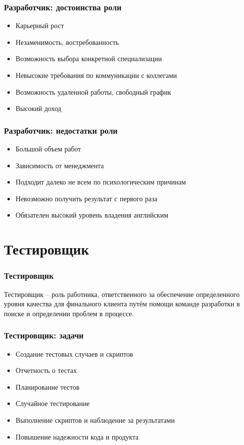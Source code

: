 \documentclass{../industrial-development}
\begin{document}
\begin{frame} \frametitle{Разработчик: достоинства роли}
	\begin{itemize}
		\item Карьерный рост
		\item Незаменимость, востребованность 
		\item Возможность выбора конкретной специализации
		\item Невысокие требования по коммуникации с коллегами
		\item Возможность удаленной работы, свободный график
		\item Высокий доход
	\end{itemize}
\end{frame}

\begin{frame} \frametitle{Разработчик: недостатки роли}
	\begin{itemize}
	  \item Большой объем работ
	  \item Зависимость от менеджмента
 	  \item Подходит далеко не всем по психологическим причинам
 	  \item Невозможно получить результат с первого раза
  	  \item Обязателен высокий уровень владения английским
	\end{itemize}
\end{frame}

\section{Тестировщик }

\begin{frame} \frametitle{Тестировщик}
	\begin{block}{}
		\alert {Тестировщик} – роль работника, ответственного за обеспечение определенного уровня качества для финального клиента путём помощи команде разработки в поиске и определении проблем в процессе.
	\end{block}
	
\end{frame}

\begin{frame} \frametitle{Тестировщик: задачи}
	\begin{itemize}
		\item Создание тестовых случаев и скриптов
		\item Отчетность о тестах
		\item Планирование тестов
		\item Случайное тестирование
		\item Выполнение скриптов и наблюдение за результатами 
		\item Повышение надежности кода и продукта
	\end{itemize}
\end{frame}
\end{document}
